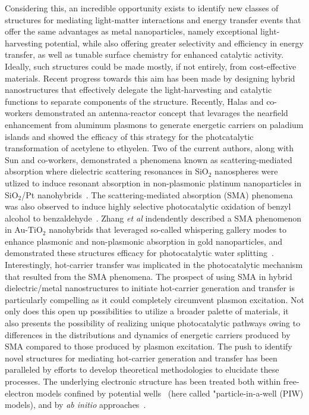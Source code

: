 \documentclass[journal=jpclcd,manuscript=letter]{achemso}
\begin{document}
Considering this, an incredible opportunity exists to identify new classes of structures for mediating light-matter interactions and energy transfer events that offer the same advantages as metal nanoparticles, 
namely exceptional light-harvesting potential, while also offering greater selectivity and efficiency in energy transfer, as well as tunable surface chemistry for enhanced catalytic activity.  
Ideally, such structures could be made mostly, if not entirely, from cost-effective materials.  Recent progress towards this aim has been made by designing hybrid 
nanostructures that effectively delegate the light-harvesting and catalytic functions to separate components of the structure.  Recently, Halas and co-workers 
demonstrated an antenna-reactor concept that levarages the nearfield enhancement from aluminum plasmons to generate energetic carriers on 
paladium islands and showed the efficacy of this strategy for the photcatalytic transformation of acetylene to ethyelen.  
Two of the current authors, along with Sun and co-workers, demonstrated a phenomena known as scattering-mediated absorption where dielectric
scattering resonances in SiO$_2$ nanospheres were utlized to induce resonant absorption in 
non-plasmonic platinum nanoparticles in SiO$_2$/Pt nanohybrids~\cite{Sun_NaturePhoton}.
The scattering-mediated absorption (SMA) phenomena was also observed to induce highly selective 
photocatalytic oxidation of benzyl alcohol to benzaldehyde~\cite{Sun_NaturePhoton}.
Zhang {\it et al} indendently described a SMA phenomenon in Au-TiO$_2$ nanohybrids that leveraged 
so-called whispering gallery modes to 
enhance plasmonic and non-plasmonic absorption in gold nanoparticles, and demonstrated these 
structures efficacy for photocatalytic water splitting~\cite{Zhang_ACSNano}.
Interestingly, hot-carrier transfer was implicated in the photocatalytic mechanism that 
resulted from the SMA phenomena.
The prospect of using SMA in hybrid dielectric/metal nanostructures to initiate hot-carrier 
generation and transfer is particularly 
compelling as it could completely circumvent plasmon excitation.  Not only does this open 
up possibilities to utilize a broader palette of materials, it also
presents the possibility of realizing unique photocatalytic pathways owing to differences 
in the distributions and dynamics of energetic carriers produced by SMA compared
to those produced by plasmon excitation.
The push to identify novel structures for mediating hot-carrier generation and transfer has been paralleled by 
efforts to develop theoretical methodologies to elucidate these processes.  The underlying electronic
structure has been treated both within free-electron models confined by potential wells~\cite{all_the_PIW_papers} (here called
"particle-in-a-well (PIW) models), and by {\it ab initio} approaches~\cite{all_the_dft_papers}.
\end{document}

